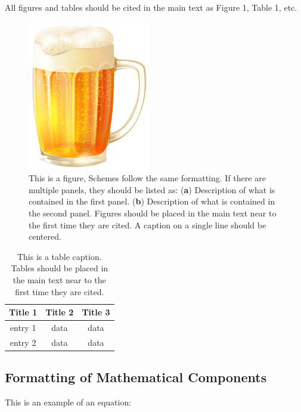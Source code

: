\documentclass[bioengineering,article,submit,moreauthors,pdftex,10pt,a4paper]{mdpi}
\begin{document}
All figures and tables should be cited in the main text as Figure 1, Table 1, etc.

 \begin{figure}[H]
 	\caption{\label{beer}This is a figure, Schemes follow the same formatting. If there are multiple panels, they should be listed as: (\textbf{a}) Description of what is contained in the first panel. (\textbf{b}) Description of what is contained in the second panel. Figures should be placed in the main text near to the first time they are cited. A caption on a single line should be centered.}
 	\begin{center}
 		\includegraphics[scale=0.40]{imagens/beer.jpg} 		
 	\end{center}
 \end{figure}  



\begin{table}[H]
\caption{This is a table caption. Tables should be placed in the main text near to the first time they are cited.}
\centering
\begin{tabular}{ccc}
\toprule
\textbf{Title 1}	& \textbf{Title 2}	& \textbf{Title 3}\\
\midrule
entry 1		& data			& data\\
entry 2		& data			& data\\
\bottomrule
\end{tabular}
\end{table}

\subsection{Formatting of Mathematical Components}

This is an example of an equation:
\end{document}
